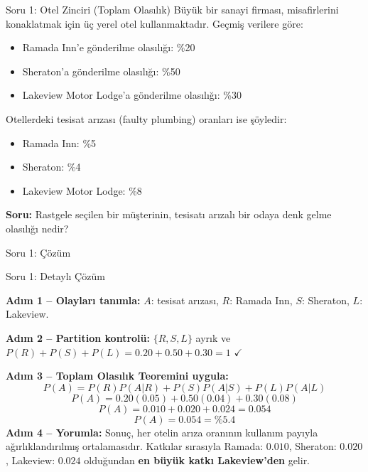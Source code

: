 \documentclass[light]{lutbeamer}
\begin{document}
\begin{frame}{Soru 1: Otel Zinciri (Toplam Olasılık)}
    Büyük bir sanayi firması, misafirlerini konaklatmak için üç yerel otel kullanmaktadır. Geçmiş verilere göre:
    \begin{itemize}
        \item Ramada Inn'e gönderilme olasılığı: \%20
        \item Sheraton'a gönderilme olasılığı: \%50
        \item Lakeview Motor Lodge'a gönderilme olasılığı: \%30
    \end{itemize}

    Otellerdeki tesisat arızası (faulty plumbing) oranları ise şöyledir:
    \begin{itemize}
        \item Ramada Inn: \%5
        \item Sheraton: \%4
        \item Lakeview Motor Lodge: \%8
    \end{itemize}

    \textbf{Soru:} Rastgele seçilen bir müşterinin, tesisatı arızalı bir odaya denk gelme olasılığı nedir?
\end{frame}

\begin{frame}{Soru 1: Çözüm}
    \vspace{5cm}
\end{frame}

\begin{frame}[allowframebreaks]{Soru 1: Detaylı Çözüm}
    \footnotesize
    {\color{red}
    \textbf{Adım 1 -- Olayları tanımla:}
    $A$: tesisat arızası, $R$: Ramada Inn, $S$: Sheraton, $L$: Lakeview.

    \textbf{Adım 2 -- Partition kontrolü:}
    $\{R,S,L\}$ ayrık ve $P(R)+P(S)+P(L)=0.20+0.50+0.30=1$ $\checkmark$

    \textbf{Adım 3 -- Toplam Olasılık Teoremini uygula:}
    \[
    P(A)=P(R)P(A|R)+P(S)P(A|S)+P(L)P(A|L)
    \]
    \[
    P(A)=0.20(0.05)+0.50(0.04)+0.30(0.08)
    \]
    \[
    P(A)=0.010+0.020+0.024=0.054
    \]
    \[
    \boxed{P(A)=0.054=\%5.4}
    \]
    \textbf{Adım 4 -- Yorumla:} Sonuç, her otelin arıza oranının kullanım payıyla ağırlıklandırılmış ortalamasıdır. Katkılar sırasıyla Ramada: $0.010$, Sheraton: $0.020$, Lakeview: $0.024$ olduğundan \textbf{en büyük katkı Lakeview'den} gelir.
    }
\end{frame}
\end{document}
